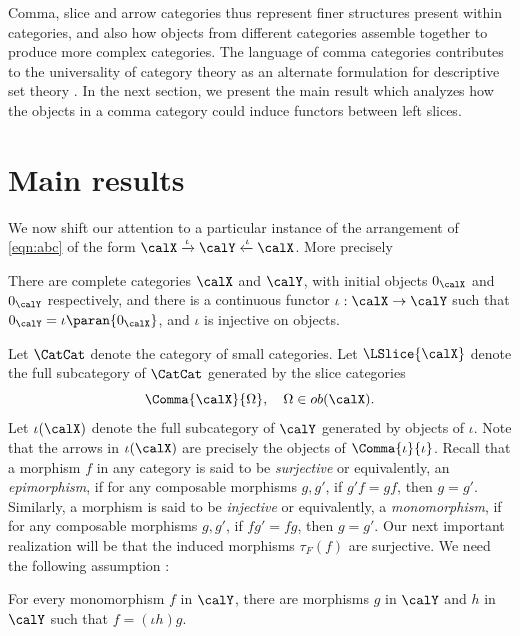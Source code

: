 \documentclass[12pt,oneside]{article}
\begin{document}
Comma, slice and arrow categories thus represent finer structures present within categories, and also how objects from different categories assemble together to produce more complex categories. The language of comma categories contributes to the universality of category theory as an alternate formulation for descriptive set theory \cite{Lawvere1963semantics}. In the next section, we present the main result which analyzes how the objects in a comma category could induce functors between left slices.

\section{Main results} \label{sec:result}

We now shift our attention to a particular instance of the arrangement of \eqref{eqn:abc} of the form $\calX  \xrightarrow{\iota} \calY \xleftarrow{\iota} \calX$. More precisely

\begin{Assumption} \label{A:1}
	There are complete categories $\calX$ and $\calY$, with initial objects $0_{\calX}$ and $0_{\calY}$ respectively, and there is a continuous functor $\iota : \calX \to \calY$ such that $0_{\calY} = \iota \paran{ 0_{\calX} }$, and $\iota$ is injective on objects.
\end{Assumption}

Let $\CatCat$ denote the category of small categories. Let $\LSlice{ \calX }$ denote the full subcategory of $\CatCat$ generated by the slice categories 
%
\[ \Comma{\calX}{\Omega}, \quad \Omega \in ob(\calX) . \]
%
Let $\iota(\calX)$ denote the full subcategory of $\calY$ generated by objects of $\iota$. Note that the arrows in $\iota(\calX)$ are precisely the objects of $\Comma{\iota}{\iota}$. Recall that a morphism $f$ in any category is said to be \emph{surjective} or equivalently, an \emph{epimorphism}, if for any composable morphisms $g,g'$, if $g'f = gf$, then $g=g'$. Similarly, a morphism is said to be \emph{injective} or equivalently, a \emph{monomorphism}, if for any composable morphisms $g,g'$, if $fg' = fg$, then $g=g'$. Our next important realization will be that the induced morphisms $\tau_{F}(f)$ are surjective. We need the following assumption : 

\begin{Assumption} \label{A:3}
	For every monomorphism $f$ in $\calY$, there are morphisms $g$ in $\calY$ and $h$ in $\calY$ such that $f = (\iota h) g$.
\end{Assumption}
\end{document}
